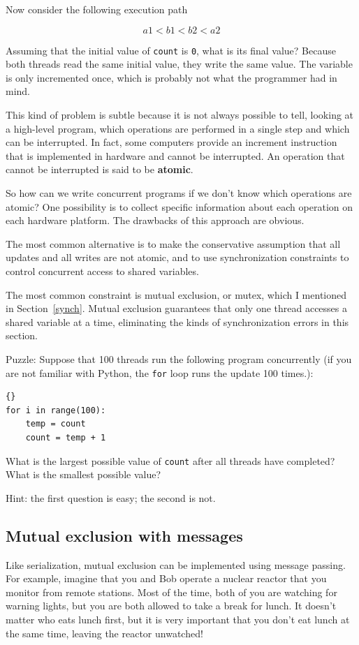 \documentclass{book}
\begin{document}
Now consider the following execution path

\[  a1 < b1 < b2 < a2  \]

Assuming that the
initial value of {\tt count} is {\tt 0},
what is its final value?  Because
both threads read the same initial value, they write
the same value.  The variable is only incremented once, which
is probably not what the programmer had in mind.

This kind of problem is subtle because it is not always possible to
tell, looking at a high-level program, which operations are
performed in a single step and which can be interrupted.
In fact, some computers provide an increment instruction that
is implemented in hardware and cannot be interrupted.
An operation that cannot be interrupted is said to be
    {\bf atomic}.

So how can we write concurrent programs if we don't know which
operations are atomic?  One possibility is to collect specific
information about each operation on each hardware platform.
The drawbacks of this approach are obvious.

The most common alternative is to make the conservative
assumption that all updates and all writes are not atomic,
and to use synchronization constraints to control concurrent
access to shared variables.

The most common constraint is mutual exclusion, or mutex,
which I mentioned in Section~\ref{synch}.  Mutual exclusion guarantees
that only one thread accesses a shared variable at a time,
eliminating the kinds of synchronization errors in this section.

Puzzle: Suppose that 100 threads run the following program concurrently
(if you are not familiar with Python, the {\tt for} loop runs the update
100 times.):

\begin{lstlisting}[]{}
for i in range(100):
    temp = count
    count = temp + 1
\end{lstlisting}

What is the largest possible value of {\tt count} after all threads
have completed?  What is the smallest possible value?

Hint: the first question is easy; the second is not.

\subsection {Mutual exclusion with messages}

Like serialization, mutual exclusion
can be implemented using message passing.  For example, imagine that
you and Bob operate a nuclear reactor that you monitor from remote
stations.  Most of the time, both of you are watching for warning
lights, but you are both allowed to take a break for lunch.  It
doesn't matter who eats lunch first, but it is very important that
you don't eat lunch at the same time, leaving the reactor unwatched!
\end{document}
